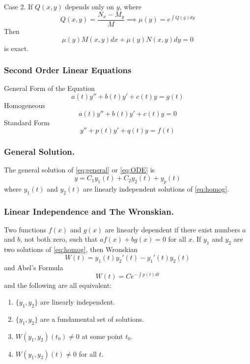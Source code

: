 \documentclass[../../main.tex]{subfiles}
\begin{document}
Case 2. If $Q(x,y)$ depends only on $y$, where
\begin{equation*}
Q(x,y)=\dfrac{N_x-M_y}{M} \implies \mu(y) = e^{\int Q(y)dy}
\end{equation*}
Then 
\begin{equation*}
\mu(y) M(x,y) dx + \mu(y)N(x,y) dy =0
\end{equation*}
is exact.

\subsubsection{Second Order Linear Equations} General Form of the Equation
\begin{equation} 
a(t)y''+b(t)y'+c(t)y=g(t) \label{eq:general}
\end{equation}
Homogeneous
\begin{equation}
a(t)y''+b(t)y'+c(t)y=0\label{eq:homog}
\end{equation}
Standard Form
\begin{equation}
 y''+p(t)y'+q(t)y=f(t) \label{eq:ODE}
\end{equation}

\subsubsection{General Solution.} The general solution of \eqref{eq:general} or \eqref{eq:ODE} is 
\begin{equation}
y = C_1 y_1(t) + C_2 y_2 (t) + y_p(t)
\end{equation}
where $y_1(t)$ and $y_2(t)$ are linearly independent solutions of \eqref{eq:homog}.

\subsubsection{Linear Independence and The Wronskian.} Two functions $f(x)$ and $g(x)$ are linearly dependent if there exist numbers $a$ and $b$, not both zero, such that $af(x)+bg(x)=0$ for all $x$. If $y_1$ and $y_2$ are two solutions of \eqref{eq:homog}, then Wronskian
\begin{equation*}
W(t) = y_1(t) y_2'(t) - y_1'(t) y_2(t)
\end{equation*}
and Abel's Formula
\begin{equation*}
W(t) = Ce^{-\int{p(t)dt}}
\end{equation*}
and the following are all equivalent: 
\begin{enumerate}
\item $\{y_1,y_2\}$ are linearly independent.
\item $\{y_1,y_2\}$ are a fundamental set of solutions.
\item $W(y_1, y_2)(t_0)\neq 0$ at some point $t_0$.
\item $W(y_1,y_2)(t) \neq 0$ for all $t$.
\end{enumerate}
\end{document}
